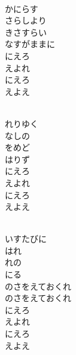 \documentclass[10pt,b5j]{tarticle} %
\begin{document}
\vspace{1.5em} %
\newcommand{\linespace}{0.5em} %
\newcommand{\blocksize}{0.5\hsize} %
\newcommand{\itemmargin}{6em} %
\begin{enumerate} %
    \setlength{\itemindent}{\itemmargin} %
    \begin{minipage}[c]{\blocksize}
    
        \vspace{\linespace}
        \item~\\
        かにらす\\
        さらしより\\
        きさすらい\\
        なすがままに\\
        にえろ\\
        えよれ\\
        にえろ\\
        えよえ
        
        \vspace{\linespace}
        \item~\\
        れりゆく\\
        なしの\\
        をめど\\
        はりず\\
        にえろ\\
        えよれ\\
        にえろ\\
        えよえ
        
        \vspace{\linespace}
        \item~\\
        いすたびに\\
        はれ\\
        れの\\
        にる\\
        のさをえておくれ\\
        のさをえておくれ\\
        にえろ\\
        えよれ\\
        にえろ\\
        えよえ
    
    \end{minipage}
\end{enumerate} %
\end{document}
